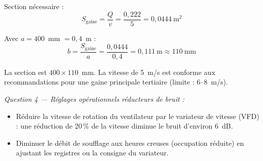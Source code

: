 Section nécessaire :
\[
  S_{\text{gaine}} = \frac{Q}{v} = \frac{0{,}222}{5} = 0{,}0444~\text{m}^2
\]

Avec $a = 400$~mm $= 0{,}4$~m :
\[
  b = \frac{S_{\text{gaine}}}{a} = \frac{0{,}0444}{0{,}4} = 0{,}111~\text{m} \approx \boxed{110~\text{mm}}
\]

La section est $400 \times 110$~mm. La vitesse de 5~m/s est conforme aux recommandations pour une gaine principale tertiaire (limite : 6--8~m/s).

\textit{Question 4 — Réglages opérationnels réducteurs de bruit :}
\begin{itemize}
  \item Réduire la vitesse de rotation du ventilateur par le variateur de vitesse (VFD) : une réduction de 20\,\% de la vitesse diminue le bruit d'environ 6~dB.
  \item Diminuer le débit de soufflage aux heures creuses (occupation réduite) en ajustant les registres ou la consigne du variateur.
\end{itemize}
